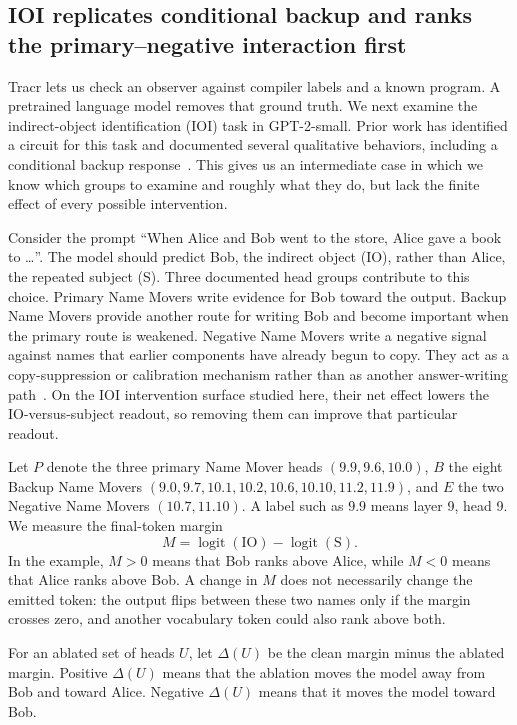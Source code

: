 \documentclass[sigconf,10pt,nonacm,balance=false]{acmart}
\DeclareMathOperator{\logit}{logit}
\begin{document}
\subsection{IOI replicates conditional backup and ranks the primary--negative interaction first}\label{sec:ioi}

Tracr lets us check an observer against compiler labels and a known program. A pretrained language model removes that ground truth. We next examine the indirect-object identification (IOI) task in GPT-2-small. Prior work has identified a circuit for this task and documented several qualitative behaviors, including a conditional backup response~\cite{wang2022ioi,mcdougall2023copy}. This gives us an intermediate case in which we know which groups to examine and roughly what they do, but lack the finite effect of every possible intervention.

Consider the prompt ``When Alice and Bob went to the store, Alice gave a book to \ldots''. The model should predict Bob, the indirect object (IO), rather than Alice, the repeated subject (S). Three documented head groups contribute to this choice. Primary Name Movers write evidence for Bob toward the output. Backup Name Movers provide another route for writing Bob and become important when the primary route is weakened. Negative Name Movers write a negative signal against names that earlier components have already begun to copy. They act as a copy-suppression or calibration mechanism rather than as another answer-writing path~\cite{mcdougall2023copy}. On the IOI intervention surface studied here, their net effect lowers the IO-versus-subject readout, so removing them can improve that particular readout.

Let $P$ denote the three primary Name Mover heads $(9.9,\allowbreak 9.6,\allowbreak 10.0)$, $B$ the eight Backup Name Movers $(9.0,\allowbreak 9.7,\allowbreak 10.1,\allowbreak 10.2,\allowbreak 10.6,\allowbreak 10.10,\allowbreak 11.2,\allowbreak 11.9)$, and $E$ the two Negative Name Movers $(10.7,\allowbreak 11.10)$. A label such as $9.9$ means layer 9, head 9. We measure the final-token margin
\[
M=\logit(\mathrm{IO})-\logit(\mathrm{S}).
\]
In the example, $M>0$ means that Bob ranks above Alice, while $M<0$ means that Alice ranks above Bob. A change in $M$ does not necessarily change the emitted token: the output flips between these two names only if the margin crosses zero, and another vocabulary token could also rank above both.

For an ablated set of heads $U$, let $\Delta(U)$ be the clean margin minus the ablated margin. Positive $\Delta(U)$ means that the ablation moves the model away from Bob and toward Alice. Negative $\Delta(U)$ means that it moves the model toward Bob.
\end{document}
